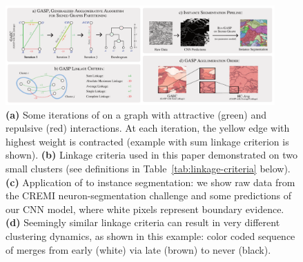 
\begin{figure}[t]
\centering
\includegraphics[width=0.92\textwidth]{figs/intro_image_v6.pdf} %
\caption{\textbf{(a)} Some iterations of \algname{} on a graph with attractive (green) and repulsive (red) interactions. At each iteration, the yellow edge with highest weight is contracted (example with sum linkage criterion is shown). \textbf{(b)} Linkage criteria used in this paper demonstrated on two small clusters (see definitions in Table~\ref{tab:linkage-criteria} below).  \textbf{(c)} Application of \algname{} to instance segmentation: we show raw data from the CREMI neuron-segmentation challenge and some predictions of our CNN model, where white pixels represent boundary evidence. \textbf{(d)} 
Seemingly similar linkage criteria can result in very different clustering dynamics, as shown in this example: color coded sequence of merges from early (white) via late (brown) to never (black).
\label{fig:intro_figure}}
\end{figure}

